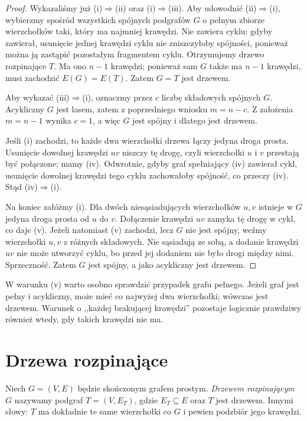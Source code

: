 \begin{proof}
Wykazaliśmy już (i)$\Rightarrow$(ii) oraz
(i)$\Rightarrow$(iii). Aby udowodnić
(ii)$\Rightarrow$(i), wybierzmy spośród wszystkich
spójnych podgrafów $G$ o pełnym zbiorze
wierzchołków taki, który ma najmniej krawędzi.
Nie zawiera cyklu: gdyby zawierał, usunięcie
jednej krawędzi cyklu nie zniszczyłoby spójności,
ponieważ można ją zastąpić pozostałym fragmentem
cyklu. Otrzymujemy drzewo rozpinające $T$.
Ma ono $n-1$ krawędzi; ponieważ sam $G$ także
ma $n-1$ krawędzi, musi zachodzić $E(G)=E(T)$.
Zatem $G=T$ jest drzewem.

Aby wykazać (iii)$\Rightarrow$(i), oznaczmy
przez $c$ liczbę składowych spójnych $G$.
Acykliczny $G$ jest lasem, zatem z poprzedniego
wniosku $m=n-c$. Z założenia $m=n-1$ wynika
$c=1$, a więc $G$ jest spójny i dlatego jest
drzewem.

Jeśli (i) zachodzi, to każde dwa wierzchołki
drzewa łączy jedyna droga prosta. Usunięcie
dowolnej krawędzi $uv$ niszczy tę drogę, czyli
wierzchołki $u$ i $v$ przestają być połączone;
mamy (iv). Odwrotnie, gdyby graf spełniający
(iv) zawierał cykl, usunięcie dowolnej krawędzi
tego cyklu zachowałoby spójność, co przeczy (iv).
Stąd (iv)$\Rightarrow$(i).

Na koniec załóżmy (i). Dla dwóch niesąsiadujących
wierzchołków $u,v$ istnieje w $G$ jedyna droga
prosta od $u$ do $v$. Dołączenie krawędzi $uv$
zamyka tę drogę w cykl, co daje (v).
Jeżeli natomiast (v) zachodzi, lecz $G$ nie
jest spójny, weźmy wierzchołki $u,v$ z różnych
składowych. Nie sąsiadują ze sobą, a dodanie
krawędzi $uv$ nie może utworzyć cyklu, bo
przed jej dodaniem nie było drogi między nimi.
Sprzeczność. Zatem $G$ jest spójny, a jako
acykliczny jest drzewem.
\end{proof}

\begin{uwaga}
W warunku (v) warto osobno sprawdzić przypadek grafu
pełnego. Jeżeli graf jest pełny i acykliczny,
może mieć co najwyżej dwa wierzchołki; wówczas
jest drzewem. Warunek o ,,każdej brakującej krawędzi''
pozostaje logicznie prawdziwy również wtedy, gdy
takich krawędzi nie ma.
\end{uwaga}

\section{Drzewa rozpinające}
\label{sec:tg-rozpinajace}

\begin{definicja}
Niech $G=(V,E)$ będzie skończonym grafem prostym.
\emph{Drzewem rozpinającym} $G$ nazywamy
podgraf $T=(V,E_T)$, gdzie $E_T\subseteq E$
oraz $T$ jest drzewem. Innymi słowy:
$T$ ma dokładnie te same wierzchołki co $G$
i pewien podzbiór jego krawędzi.
\end{definicja}

